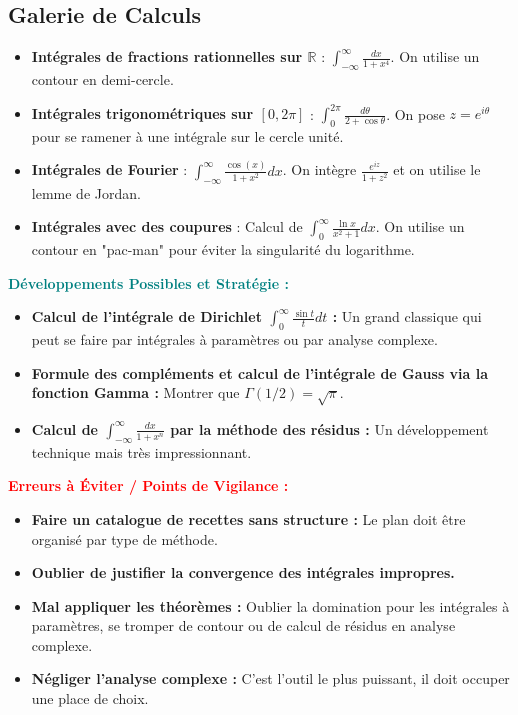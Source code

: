\documentclass[12pt, a4paper, parskip=full]{report}
\theoremstyle{agregstyle}
\newenvironment{developpements}
  {\par\medskip\noindent\begin{oframed}\noindent\textbf{\textcolor{teal}{Développements Possibles et Stratégie :}}}
  {\end{oframed}\par\medskip}
\newenvironment{erreurs}
  {\par\medskip\noindent\begin{oframed}\noindent\textbf{\textcolor{red}{Erreurs à Éviter / Points de Vigilance :}}}
  {\end{oframed}\par\medskip}
\begin{document}
\subsection{Galerie de Calculs}
\begin{itemize}
    \item \textbf{Intégrales de fractions rationnelles sur $\mathbb{R}$} : $\int_{-\infty}^\infty \frac{dx}{1+x^4}$. On utilise un contour en demi-cercle.
    \item \textbf{Intégrales trigonométriques sur $[0, 2\pi]$} : $\int_0^{2\pi} \frac{d\theta}{2+\cos\theta}$. On pose $z=e^{i\theta}$ pour se ramener à une intégrale sur le cercle unité.
    \item \textbf{Intégrales de Fourier} : $\int_{-\infty}^\infty \frac{\cos(x)}{1+x^2} dx$. On intègre $\frac{e^{iz}}{1+z^2}$ et on utilise le lemme de Jordan.
    \item \textbf{Intégrales avec des coupures} : Calcul de $\int_0^\infty \frac{\ln x}{x^2+1}dx$. On utilise un contour en "pac-man" pour éviter la singularité du logarithme.
\end{itemize}

\begin{developpements}
    \begin{itemize}
        \item \textbf{Calcul de l'intégrale de Dirichlet $\int_0^\infty \frac{\sin t}{t} dt$ :} Un grand classique qui peut se faire par intégrales à paramètres ou par analyse complexe.
        \item \textbf{Formule des compléments et calcul de l'intégrale de Gauss via la fonction Gamma :} Montrer que $\Gamma(1/2)=\sqrt{\pi}$.
        \item \textbf{Calcul de $\int_{-\infty}^\infty \frac{dx}{1+x^n}$ par la méthode des résidus :} Un développement technique mais très impressionnant.
    \end{itemize}
\end{developpements}

\begin{erreurs}
    \begin{itemize}
        \item \textbf{Faire un catalogue de recettes sans structure :} Le plan doit être organisé par type de méthode.
        \item \textbf{Oublier de justifier la convergence des intégrales impropres.}
        \item \textbf{Mal appliquer les théorèmes :} Oublier la domination pour les intégrales à paramètres, se tromper de contour ou de calcul de résidus en analyse complexe.
        \item \textbf{Négliger l'analyse complexe :} C'est l'outil le plus puissant, il doit occuper une place de choix.
    \end{itemize}
\end{erreurs}
\end{document}
